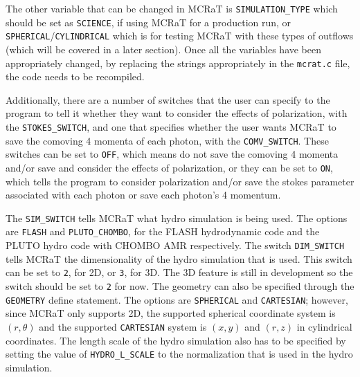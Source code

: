 \documentclass[12pt,a4paper]{article}
\begin{document}
The other variable that can be changed in MCRaT is \texttt{SIMULATION\_TYPE} which should be set as \texttt{SCIENCE}, if using MCRaT for a production run, or \texttt{SPHERICAL}/\texttt{CYLINDRICAL} which is for testing MCRaT with these types of outflows (which will be covered in a later section). Once all the variables have been appropriately changed, by replacing the strings appropriately in the \texttt{mcrat.c} file, the code needs to be recompiled.

Additionally, there are a number of switches that the user can specify to the program to tell it whether they want to consider the effects of polarization, with the \texttt{STOKES\_SWITCH}, and one that specifies whether the user wants MCRaT to save the comoving 4 momenta of each photon, with the \texttt{COMV\_SWITCH}. These switches can be set to \texttt{OFF}, which means do not save the comoving 4 momenta and/or save and consider the effects of polarization, or they can be set to \texttt{ON}, which tells the program to consider polarization and/or save the stokes parameter associated with each photon or save each photon's 4 momentum.

The \texttt{SIM\_SWITCH} tells MCRaT what hydro simulation is being used. The options are \texttt{FLASH} and \texttt{PLUTO\_CHOMBO}, for the FLASH hydrodynamic code and the PLUTO hydro code with CHOMBO AMR respectively. The switch \texttt{DIM\_SWITCH} tells MCRaT the dimensionality of the hydro simulation that is used. This switch can be set to \texttt{2}, for 2D, or \texttt{3}, for 3D. The 3D feature is still in development so the switch should be set to \texttt{2} for now. The geometry can also be specified through the \texttt{GEOMETRY} define statement. The options are \texttt{SPHERICAL} and \texttt{CARTESIAN}; however, since MCRaT only supports 2D, the supported spherical coordinate system is $(r, \theta)$ and the supported \texttt{CARTESIAN} system is $(x,y)$ and $(r,z)$ in cylindrical coordinates. The length scale of the hydro simulation also has to be specified by setting the value of \texttt{HYDRO\_L\_SCALE} to the normalization that is used in the hydro simulation.
\end{document}
